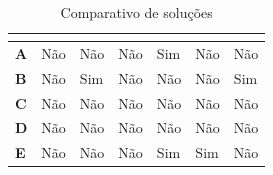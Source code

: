 \documentclass[
	12pt,				%
	openright,			%
	oneside,			%
	a4paper,			%
	english,			%
	french,				%
	spanish,			%
	brazil,				%
	]{abntex2}
\begin{document}
 
\begin{table}[h!]
\centering
\caption{Comparativo de soluções}
\label{my-label}
\begin{tabular}{L|L|L|L|L|L|L}
\hline
\textbf{}	&       &       &       &       &       &       \\ \hline
\textbf{A}	& Não                                               & Não                                                                          & Não                                                 & Sim                                                             & Não                                                       & Não                                                                  \\ \hline
\textbf{B}	& Não                                               & Sim                                                                          & Não                                                 & Não                                                             & Não                                                       & Sim                                                                  \\ \hline
\textbf{C}	& Não                                               & Não                                                                          & Não                                                 & Não                                                             & Não                                                       & Não                                                                  \\ \hline
\textbf{D}	& Não                                               & Não                                                                          & Não                                                 & Não                                                             & Não                                                       & Não                                                                  \\ \hline
\textbf{E}	& Não                                               & Não                                                                          & Não                                                 & Sim                                                             & Sim                                                       & Não                                                                  \\ \hline

\end{tabular}
\end{table}
\end{document}
